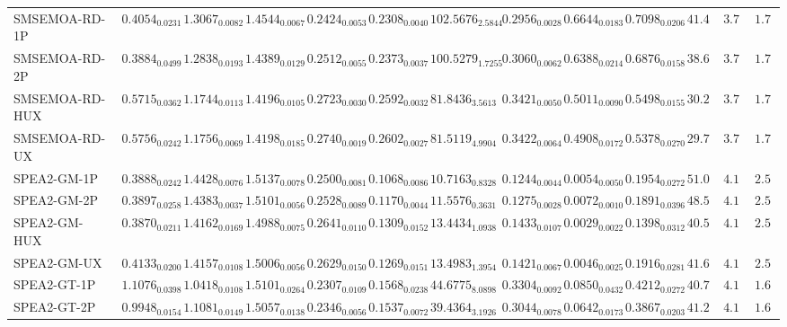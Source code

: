 \documentclass[11pt,a4paper]{article}
\begin{document}
\begin{table}[H]
{\begin{tabular}{lcccccccccccc}
SMSEMOA-RD-1P & $0.4054_{0.0231}$ & $1.3067_{0.0082}$ & $1.4544_{0.0067}$ & $0.2424_{0.0053}$ & $0.2308_{0.0040}$ & $102.5676_{2.5844}$ & $0.2956_{0.0028}$ & $0.6644_{0.0183}$ & $0.7098_{0.0206}$ & $41.44$ & $3.78$ & $1.78$ \\
SMSEMOA-RD-2P & $0.3884_{0.0499}$ & $1.2838_{0.0193}$ & $1.4389_{0.0129}$ & $0.2512_{0.0055}$ & $\mathbf{0.2373}_{0.0037}$ & $100.5279_{1.7255}$ & $0.3060_{0.0062}$ & $0.6388_{0.0214}$ & $0.6876_{0.0158}$ & $38.67$ & $3.78$ & $1.78$ \\
SMSEMOA-RD-HUX & $0.5715_{0.0362}$ & $1.1744_{0.0113}$ & $1.4196_{0.0105}$ & $\mathbf{0.2723}_{0.0030}$ & $\mathbf{0.2592}_{0.0032}$ & $81.8436_{3.5613}$ & $0.3421_{0.0050}$ & $0.5011_{0.0090}$ & $0.5498_{0.0155}$ & $30.22$ & $3.78$ & $1.78$ \\
SMSEMOA-RD-UX & $0.5756_{0.0242}$ & $1.1756_{0.0069}$ & $1.4198_{0.0185}$ & $\mathbf{0.2740}_{0.0019}$ & $\mathbf{0.2602}_{0.0027}$ & $81.5119_{4.9904}$ & $0.3422_{0.0064}$ & $0.4908_{0.0172}$ & $0.5378_{0.0270}$ & $29.78$ & $3.78$ & $1.78$ \\
SPEA2-GM-1P & $0.3888_{0.0242}$ & $1.4428_{0.0076}$ & $1.5137_{0.0078}$ & $0.2500_{0.0081}$ & $0.1068_{0.0086}$ & $10.7163_{0.8328}$ & $0.1244_{0.0044}$ & $0.0054_{0.0050}$ & $0.1954_{0.0272}$ & $51.00$ & $4.11$ & $2.56$ \\
SPEA2-GM-2P & $0.3897_{0.0258}$ & $1.4383_{0.0037}$ & $1.5101_{0.0056}$ & $0.2528_{0.0089}$ & $0.1170_{0.0044}$ & $11.5576_{0.3631}$ & $0.1275_{0.0028}$ & $0.0072_{0.0010}$ & $0.1891_{0.0396}$ & $48.56$ & $4.11$ & $2.56$ \\
SPEA2-GM-HUX & $0.3870_{0.0211}$ & $1.4162_{0.0169}$ & $1.4988_{0.0075}$ & $0.2641_{0.0110}$ & $0.1309_{0.0152}$ & $13.4434_{1.0938}$ & $0.1433_{0.0107}$ & $0.0029_{0.0022}$ & $0.1398_{0.0312}$ & $40.56$ & $4.11$ & $2.56$ \\
SPEA2-GM-UX & $0.4133_{0.0200}$ & $1.4157_{0.0108}$ & $1.5006_{0.0056}$ & $0.2629_{0.0150}$ & $0.1269_{0.0151}$ & $13.4983_{1.3954}$ & $0.1421_{0.0067}$ & $0.0046_{0.0025}$ & $0.1916_{0.0281}$ & $41.67$ & $4.11$ & $2.56$ \\
SPEA2-GT-1P & $1.1076_{0.0398}$ & $1.0418_{0.0108}$ & $1.5101_{0.0264}$ & $0.2307_{0.0109}$ & $0.1568_{0.0238}$ & $44.6775_{8.0898}$ & $0.3304_{0.0092}$ & $0.0850_{0.0432}$ & $0.4212_{0.0272}$ & $40.78$ & $4.11$ & $\mathbf{1.67}$ \\
SPEA2-GT-2P & $0.9948_{0.0154}$ & $1.1081_{0.0149}$ & $1.5057_{0.0138}$ & $0.2346_{0.0056}$ & $0.1537_{0.0072}$ & $39.4364_{3.1926}$ & $0.3044_{0.0078}$ & $0.0642_{0.0173}$ & $0.3867_{0.0203}$ & $41.22$ & $4.11$ & $\mathbf{1.67}$ \\

\end{tabular}}
\end{table}
\end{document}
